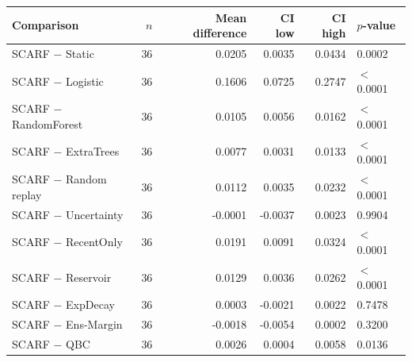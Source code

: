 \begin{tabular}{lrrrrl}
\toprule
Comparison & $n$ & Mean difference & CI low & CI high & $p$-value \\
\midrule
SCARF $-$ Static & 36 & 0.0205 & 0.0035 & 0.0434 & 0.0002 \\
SCARF $-$ Logistic & 36 & 0.1606 & 0.0725 & 0.2747 & $<$0.0001 \\
SCARF $-$ RandomForest & 36 & 0.0105 & 0.0056 & 0.0162 & $<$0.0001 \\
SCARF $-$ ExtraTrees & 36 & 0.0077 & 0.0031 & 0.0133 & $<$0.0001 \\
SCARF $-$ Random replay & 36 & 0.0112 & 0.0035 & 0.0232 & $<$0.0001 \\
SCARF $-$ Uncertainty & 36 & -0.0001 & -0.0037 & 0.0023 & 0.9904 \\
SCARF $-$ RecentOnly & 36 & 0.0191 & 0.0091 & 0.0324 & $<$0.0001 \\
SCARF $-$ Reservoir & 36 & 0.0129 & 0.0036 & 0.0262 & $<$0.0001 \\
SCARF $-$ ExpDecay & 36 & 0.0003 & -0.0021 & 0.0022 & 0.7478 \\
SCARF $-$ Ens-Margin & 36 & -0.0018 & -0.0054 & 0.0002 & 0.3200 \\
SCARF $-$ QBC & 36 & 0.0026 & 0.0004 & 0.0058 & 0.0136 \\
\bottomrule
\end{tabular}
